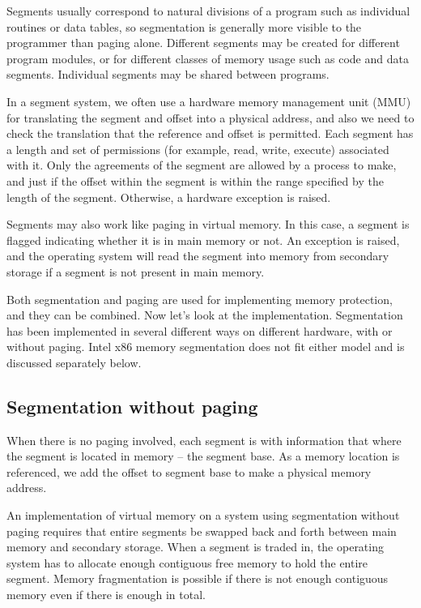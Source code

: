 \documentclass[doc,natbib,12pt]{apa6}
\begin{document}
	Segments usually correspond to natural divisions of a program such as individual routines or data tables, so segmentation is generally more visible to the programmer than paging alone. Different segments may be created for different program modules, or for different classes of memory usage such as code and data segments. Individual segments may be shared between programs. \citep{Englander2003}
	
	In a segment system, we often use a hardware memory management unit (MMU) for translating the segment and offset into a physical address, and also we need to check the translation that the reference and offset is permitted. Each segment has a length and set of permissions (for example, read, write, execute) associated with it. Only the agreements of the segment are allowed by a process to make, and just if the offset within the segment is within the range specified by the length of the segment. Otherwise, a hardware exception is raised.
	
	Segments may also work like paging in virtual memory. In this case, a segment is flagged indicating whether it is in main memory or not. An exception is raised, and the operating system will read the segment into memory from secondary storage if a segment is not present in main memory.
	
	Both segmentation and paging are used for implementing memory protection, and they can be combined. Now let's look at the implementation. Segmentation has been implemented in several different ways on different hardware, with or without paging. Intel x86 memory segmentation does not fit either model and is discussed separately below. \citep{Intel2012}
	
	\subsection{Segmentation without paging}
	When there is no paging involved, each segment is with information that where the segment is located in memory -- the segment base. As a memory location is referenced, we add the offset to segment base to make a physical memory address.
	
	An implementation of virtual memory on a system using segmentation without paging requires that entire segments be swapped back and forth between main memory and secondary storage. When a segment is traded in, the operating system has to allocate enough contiguous free memory to hold the entire segment. Memory fragmentation is possible if there is not enough contiguous memory even if there is enough in total.
	
\end{document}
